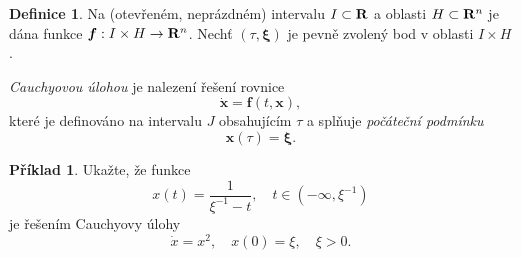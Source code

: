 \documentclass[a4paper, 12pt]{book}
\theoremstyle{definition}
\newtheorem{definition}[theorem]{Definice}
\newtheorem{example}[theorem]{Příklad}
\def\to{\rightarrow}
\def\Real{{\rm\bf R}}
\def\vc#1{\mathbf{\boldsymbol{#1}}}     %
\begin{document}
\begin{definition}
\label{Cauchy}
Na (otevřeném, neprázdném) intervalu $I \subset \Real$  a oblasti $H \subset \Real^n$ je 
dána funkce $\vc f: I\times H \to \Real^n$. Nechť $(\tau, \vc \xi)$ je pevně zvolený bod v oblasti $I\times H$.

\emph{Cauchyovou úlohou} je nalezení řešení rovnice
\[
    \dot{\vc x} = \vc f(t,\vc x),
\]
které je definováno na intervalu $J$ obsahujícím $\tau$ a splňuje \emph {počáteční podmínku}
\[
    \vc x(\tau)=\vc \xi.
\]
\end{definition}

\begin{example}
Ukažte, že funkce
\begin{displaymath}
x(t) = \frac {1}{\xi^{-1}-t},\quad t\in(-\infty, \xi^{-1})
\end{displaymath}
je řešením Cauchyovy úlohy
\begin{displaymath}
\dot x = x^2,\quad x(0)=\xi,\quad \xi>0.
\end{displaymath}
\end{example}
\end{document}
